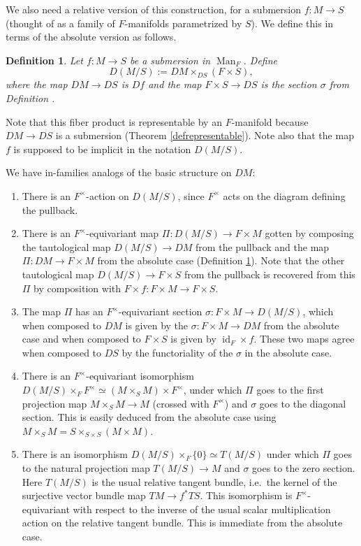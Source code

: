 \documentclass[12pt]{article}
\newtheorem{definition}[theorem]{Definition}
\newcommand{\on}{\operatorname}
\begin{document}
We also need a relative version of this construction, for a submersion $f:M\rightarrow S$ (thought of as a family of $F$-manifolds parametrized by $S$).  We define this in terms of the absolute version as follows.

\begin{definition}
Let $f:M\rightarrow S$ be a submersion in $\on{Man}_F$.  Define
$$D(M/S):= DM\times_{DS} (F\times S),$$
where the map $DM\to DS$ is $Df$ and the map $F\times S\rightarrow DS$ is the section $\sigma$ from Definition \label{defstructure}.
\end{definition}

Note that this fiber product is representable by an $F$-manifold because $DM\rightarrow DS$ is a submersion (Theorem \ref{defrepresentable}).  Note also that the map $f$ is supposed to be implicit in the notation $D(M/S)$.

We have in-families analogs of the basic structure on $DM$:

\begin{enumerate}
\item There is an $F^\times$-action on $D(M/S)$, since $F^\times$ acts on the diagram defining the pullback.
\item There is an $F^\times$-equivariant map $\Pi:D(M/S)\rightarrow F\times M$ gotten by composing the tautological map $D(M/S)\rightarrow DM$ from the pullback and the map $\Pi:DM\rightarrow F\times M$ from the absolute case (Definition \ref{defstructure}).  Note that the other tautological map $D(M/S)\rightarrow F\times S$ from the pullback is recovered from this $\Pi$ by composition with $F\times f:F\times M\rightarrow F\times S$.
\item The map $\Pi$ has an $F^\times$-equivariant section $\sigma:F\times M\rightarrow D(M/S)$, which when composed to $DM$ is given by the $\sigma:F\times M\rightarrow DM$ from the absolute case and when composed to $F\times S$ is given by $\on{id}_F\times f$.  These two maps agree when composed to $DS$ by the functoriality of the $\sigma$ in the absolute case.
\item There is an $F^\times$-equivariant isomorphism $D(M/S)\times_F F^\times \simeq  (M\times_SM)\times F^\times $, under which $\Pi$ goes to the first projection map $M\times_S M\rightarrow M$ (crossed with $F^\times$) and $\sigma$ goes to the diagonal section.  This is easily deduced from the absolute case using $M\times_S M = S\times_{S\times S}(M\times M)$.
\item There is an isomorphism $D(M/S)\times_F \{0\}\simeq T(M/S)$ under which $\Pi$ goes to the natural projection map $T(M/S)\rightarrow M$ and $\sigma$ goes to the zero section.  Here $T(M/S)$ is the usual relative tangent bundle, i.e.\ the kernel of the surjective vector bundle map $TM\rightarrow f^\ast TS$.  This isomorphism is $F^\times$-equivariant with respect to the inverse of the usual scalar multiplication action on the relative tangent bundle.  This is immediate from the absolute case.
\end{enumerate}
\end{document}
